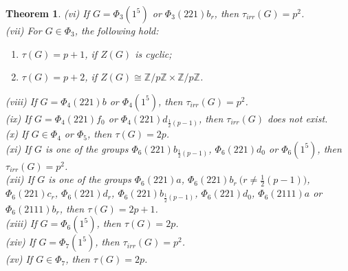 \documentclass[a4paper,11pt]{amsart}
\numberwithin{equation}{section}
\numberwithin{equation}{subsection}
\newtheorem{theorem}{Theorem}[section]
\newcommand{\Z}{\mathbb{Z}}
\newcommand{\tg}{\tau(G)}
\newcommand{\ti}{\tau_{irr}(G)}
\begin{document}
\begin{theorem}
(vi) If $G = \Phi_{3}(1^5)$ or $\Phi_{3}(221)b_{r}$, then $\ti= p^2$.  \\

(vii) For $G \in \Phi_{3} $, the following hold:
\begin{enumerate}[label=(\alph*)]
	\item $\tau(G) = p+1$, if $Z(G)$ is cyclic;
	\item $\tau(G) = p+2$, if $Z(G) \cong \Z/p\Z \times \Z/p\Z$.  \\
\end{enumerate} 

(viii) If $G = \Phi_{4}(221)b$ or $\Phi_{4}(1^5)$, then $\ti=p^2$.  \\

(ix) If $G = \Phi_{4}(221)f_0$ or $\Phi_{4}(221)d_{\tfrac{1}{2}(p-1)}$, then $\ti$ does not exist. \\ 

(x) If $G \in \Phi_{4}$ or $\Phi_{5}$, then $\tg = 2p$. \\




(xi) If $G$ is one of the groups $\Phi_{6}(221)b_{\tfrac{1}{2}(p-1)}$, $\Phi_{6}(221)d_0$ or $\Phi_{6}(1^5)$, then $\ti= p^2$.  \\

(xii) If $G$ is one of the groups $\Phi_{6}(221)a$, $\Phi_{6}(221)b_r \ \big(r \neq \tfrac{1}{2}(p-1)\big)$, $\Phi_{6}(221)c_r$, $\Phi_{6}(221)d_r$, $\Phi_{6}(221)b_{\tfrac{1}{2}(p-1)}$, $\Phi_{6}(221)d_0$, $\Phi_6(2111)a$ or  $\Phi_6(2111){b_r}$, then $\tg = 2p+1$. \\

(xiii) If $G= \Phi_{6}(1^5)$, then $\tg = 2p$. \\


(xiv) If $G = \Phi_{7}(1^5)$, then $\ti= p^2$. \\

(xv) If $G \in \Phi_{7}$, then $\tg = 2p$. \\


\end{theorem}
\end{document}
